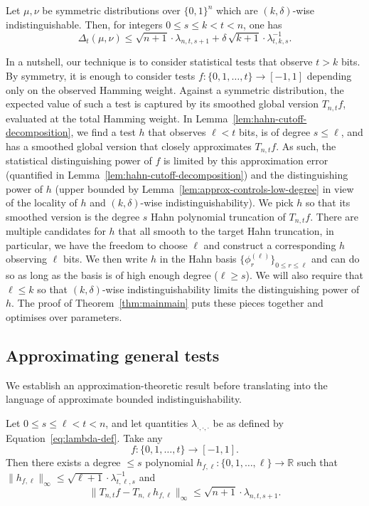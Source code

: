 \documentclass[manuscript,nonacm]{acmart}
\begin{document}
\begin{theorem}
\label{thm:mainmain}
    Let \(\mu,\nu\) be symmetric distributions over \(\{0,1\}^n\) which are
\((k,\delta)\)-wise indistinguishable.  Then, for integers $0\le s\le k<t<n$,
one has
\[
\Delta_t(\mu,\nu)\leq \sqrt{n+1}\cdot\lambda_{n,t,s+1}+\delta\,\sqrt{k+1}\cdot \lambda^{-1}_{t,k,s}.
\]
\end{theorem}
In a nutshell, our technique is to consider statistical tests
that observe \(t>k\) bits. By symmetry, it is enough to consider tests
\(f:\{0,1,\dots,t\}\to[-1,1]\) depending only on the observed Hamming
weight. Against a symmetric distribution, the
expected value of such a test is captured by its smoothed global version
\(T_{n,t}f\), evaluated at the total Hamming weight. In Lemma~\ref{lem:hahn-cutoff-decomposition}, we find a test $h$ that observes $\ell<t$ bits, is of degree $s\leq\ell$, and has a smoothed global version that closely approximates \(T_{n,t}f\). As such, the statistical distinguishing power of $f$ is limited by this approximation error (quantified in Lemma~\ref{lem:hahn-cutoff-decomposition}) and the distinguishing power of $h$ (upper bounded by Lemma~\ref{lem:approx-controls-low-degree} in view of the locality of $h$ and $(k,\delta)$-wise indistinguishability). 
We pick $h$ so that its smoothed version is the degree $s$ Hahn polynomial truncation of \(T_{n,t}f\). There are multiple candidates for $h$ that all smooth to the target Hahn truncation, in particular, we have the freedom to choose $\ell$ and construct a corresponding $h$ observing $\ell$ bits. We then write $h$ in the Hahn basis $\{\phi^{(\ell)}_r\}_{0\leq r\leq \ell}$ and can do so as long as the basis is of high enough degree ($\ell\geq s$). We will also require that $\ell\leq k$ so that $(k,\delta)$-wise indistinguishability limits the distinguishing power of $h$. The proof of Theorem~\ref{thm:mainmain} puts these pieces together and optimises over parameters.



\subsection{Approximating general tests}
We establish an approximation-theoretic result before translating into the language of approximate bounded indistinguishability.
\begin{lemma}
\label{lem:hahn-cutoff-decomposition}
Let \(0\le s\leq\ell<t<n\), and let quantities $\lambda_{\cdot,\cdot,\cdot}$ be as defined by Equation~\ref{eq:lambda-def}. Take any
\[
    f:\{0,1,\dots,t\}\to[-1,1].
\]
Then there exists a degree $\leq s$ polynomial $h_{f,\ell}:\{0,1,\dots,\ell\}\to\mathbb R$
such that $\|h_{f,\ell}\|_\infty\le\sqrt{\ell+1}\cdot \lambda^{-1}_{t,\ell,s}$ and
\begin{equation}
\label{eq:hahn-cutoff-remainder-bound}
    \|T_{n,t}f-T_{n,\ell}h_{f,\ell}\|_\infty
    \le
    \sqrt{n+1}\cdot\lambda_{n,t,s+1}.
\end{equation}
\end{lemma}
\end{document}
